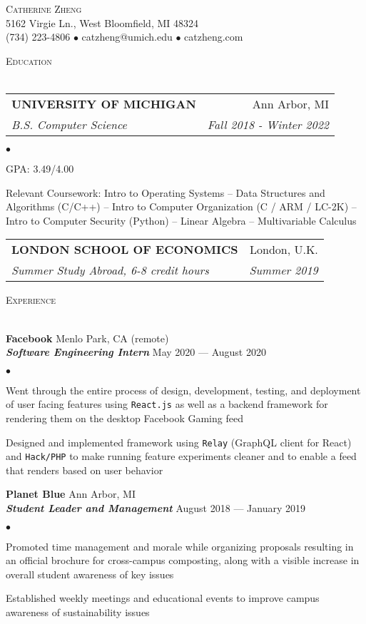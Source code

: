 \documentclass{article}
\makeatletter
\newcommand{\lineunder}{\vspace*{-8pt} \\ \hspace*{-20pt} \hrulefill \\}
\newcommand{\header}[1]{{\hspace*{-20pt}\vspace*{6pt} \large\textsc{#1}} \vspace*{-5pt} \lineunder \vspace{3pt}}
\newcommand{\employer}[4]{{ \normalsize\textbf{#1} \small\hfill{#2}\\ {\small\textbf{\emph{#3}}} \small\hfill{#4}\\ }}
\newcommand{\contact}[3]{
\vspace*{-5pt}
\begin{center}
{\huge \scshape {#1}}\\
\vspace{2pt}
#2\\
#3
\end{center}
\vspace*{-10pt}
}
\newenvironment{achievements}{\begin{list}{$\bullet$}{\topsep 0pt \itemsep 0pt}}{\vspace*{5pt}\end{list}}
\newcommand{\school}[4]{
\begin{tabular*}{6.55in}{l@{\extracolsep{\fill}}r}
	\uppercase{\normalsize\textbf{#1}} & #2 \\
	\textit{#3} & \textit{#4}\\
\end{tabular*}\vspace*{3pt}}
\makeatother
\begin{document}
\small
\smallskip
\vspace*{-40pt}

\contact{Catherine Zheng}
{\small5162 Virgie Ln., West Bloomfield, MI 48324}
{\small(734) 223-4806 $\bullet$ catzheng@umich.edu  $\bullet$ catzheng.com}

\vspace{10pt}
\header{Education}

\vspace{1ex}
\school{University of Michigan}{Ann Arbor, MI}{B.S. Computer Science}{Fall 2018 - Winter 2022}
\begin{achievements}
\item GPA: 3.49/4.00
\item Relevant Coursework: Intro to Operating Systems -- Data Structures and Algorithms (C/C++) -- Intro to Computer Organization (C / ARM / LC-2K) -- Intro to Computer Security (Python) -- Linear Algebra -- Multivariable Calculus
\end{achievements}
\vspace{1pt}
\school{London School of Economics}{London, U.K.}{Summer Study Abroad, 6-8 credit hours}{Summer 2019}
\vspace{1pt}

\header{Experience}

\employer{Facebook}{Menlo Park, CA (remote)}{Software Engineering Intern}{May 2020 --- August 2020}
	\begin{achievements}
	\item Went through the entire process of design, development, testing, and deployment of user facing features using \texttt{React.js} as well as a backend framework for rendering them on the desktop Facebook Gaming feed
	\item Designed and implemented framework using \texttt{Relay} (GraphQL client for React) and \texttt{Hack/PHP} to make running feature experiments cleaner and to enable a feed that renders based on user behavior
	\end{achievements}

\employer{Planet Blue}{Ann Arbor, MI}{Student Leader and Management}{August 2018 --- January 2019}
	\begin{achievements}
	\item Promoted time management and morale while organizing proposals resulting in an official brochure for cross-campus composting, along with a visible increase in overall student awareness of key issues
	\item Established weekly meetings and educational events to improve campus awareness of sustainability issues
	\end{achievements}
\end{document}
